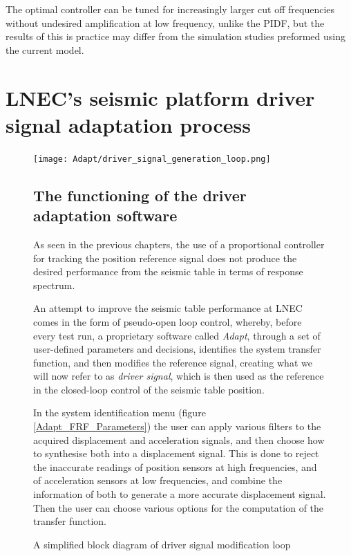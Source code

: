 \documentclass[9pt]{extarticle}
\begin{document}
The optimal controller can be tuned for increasingly larger cut off frequencies without undesired amplification at low frequency, unlike the PIDF, but the results of this is practice may differ from the simulation studies preformed using the current model.

\section{LNEC's seismic platform driver signal adaptation process}

\begin{figure}[H]
\begin{minipage}{0.4\textwidth}
    \centering
    \texttt{[image: Adapt/driver\_signal\_generation\_loop.png]}
    \caption{A simplified block diagram of driver signal modification loop}
    \label{driver_signal_generation_loop}
\end{minipage}
\hfill
\begin{minipage}{0.55\textwidth}
    \subsection{The functioning of the driver adaptation software}
As seen in the previous chapters, the use of a proportional controller for tracking the position reference signal does not produce the desired performance from the seismic table in terms of response spectrum. 

An attempt to improve the seismic table performance at LNEC comes in the form of pseudo-open loop control, whereby, before every test run, a proprietary software %
called \emph{Adapt}, through a set of user-defined parameters and decisions, identifies the system transfer function, and then modifies the reference signal, creating what we will now refer to as \emph{driver signal}, which is then used as the reference in the closed-loop control of the seismic table position.

In the system identification menu (figure \ref{Adapt_FRF_Parameters}) the user can apply various filters to the acquired displacement and acceleration signals, and then choose how to synthesise both into a displacement signal. This is done to reject the inaccurate readings of position sensors at high frequencies, and of acceleration sensors at low frequencies, and combine the information of both to generate a more accurate displacement signal. Then the user can choose various options for the computation of the transfer function.
\end{minipage}
\end{figure}
\end{document}
